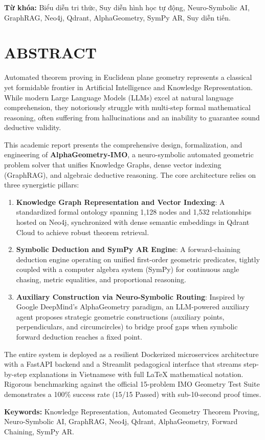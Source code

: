 \textbf{Từ khóa:} Biểu diễn tri thức, Suy diễn hình học tự động, Neuro-Symbolic AI, GraphRAG, Neo4j, Qdrant, AlphaGeometry, SymPy AR, Suy diễn tiến.

\newpage

\chapter*{ABSTRACT}

Automated theorem proving in Euclidean plane geometry represents a classical yet formidable frontier in Artificial Intelligence and Knowledge Representation. While modern Large Language Models (LLMs) excel at natural language comprehension, they notoriously struggle with multi-step formal mathematical reasoning, often suffering from hallucinations and an inability to guarantee sound deductive validity.

This academic report presents the comprehensive design, formalization, and engineering of \textbf{AlphaGeometry-IMO}, a neuro-symbolic automated geometric problem solver that unifies Knowledge Graphs, dense vector indexing (GraphRAG), and algebraic deductive reasoning. The core architecture relies on three synergistic pillars:
\begin{enumerate}
    \item \textbf{Knowledge Graph Representation and Vector Indexing}: A standardized formal ontology spanning 1,128 nodes and 1,532 relationships hosted on Neo4j, synchronized with dense semantic embeddings in Qdrant Cloud to achieve robust theorem retrieval.
    \item \textbf{Symbolic Deduction and SymPy AR Engine}: A forward-chaining deduction engine operating on unified first-order geometric predicates, tightly coupled with a computer algebra system (SymPy) for continuous angle chasing, metric equalities, and proportional reasoning.
    \item \textbf{Auxiliary Construction via Neuro-Symbolic Routing}: Inspired by Google DeepMind's AlphaGeometry paradigm, an LLM-powered auxiliary agent proposes strategic geometric constructions (auxiliary points, perpendiculars, and circumcircles) to bridge proof gaps when symbolic forward deduction reaches a fixed point.
\end{enumerate}

The entire system is deployed as a resilient Dockerized microservices architecture with a FastAPI backend and a Streamlit pedagogical interface that streams step-by-step explanations in Vietnamese with full LaTeX mathematical notation. Rigorous benchmarking against the official 15-problem IMO Geometry Test Suite demonstrates a 100\% success rate (15/15 Passed) with sub-10-second proof times.

\textbf{Keywords:} Knowledge Representation, Automated Geometry Theorem Proving, Neuro-Symbolic AI, GraphRAG, Neo4j, Qdrant, AlphaGeometry, Forward Chaining, SymPy AR.
